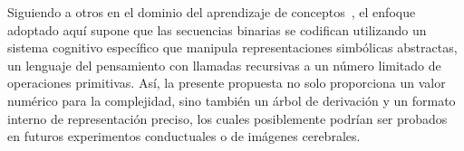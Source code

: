 Siguiendo a otros en el dominio del aprendizaje de conceptos~\cite{piantadosi2012bootstrapping,piantadosi2016logical}, el enfoque adoptado aquí supone que las secuencias binarias se codifican utilizando un sistema cognitivo específico que manipula representaciones simbólicas abstractas, un lenguaje del pensamiento con llamadas recursivas a un número limitado de operaciones primitivas. Así, la presente propuesta no solo proporciona un valor numérico para la complejidad, sino también un árbol de derivación y un formato interno de representación preciso, los cuales posiblemente podrían ser probados en futuros experimentos conductuales o de imágenes cerebrales.


